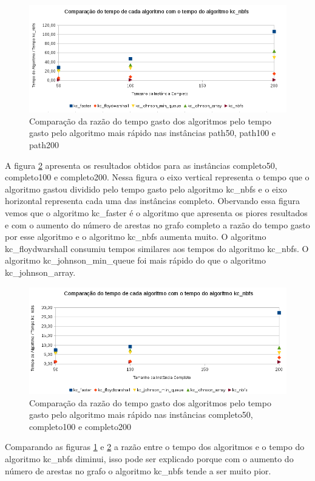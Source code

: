 \begin{figure}
\centering
\includegraphics[width=6in]{path.png}
\caption{Comparação da razão do tempo gasto dos algoritmos pelo tempo gasto pelo algoritmo mais rápido nas instâncias path50, path100 e path200}
\label{path}
\end{figure}

A figura \ref{completo} apresenta os resultados obtidos para as instâncias completo50, completo100 e completo200.  Nessa figura o eixo vertical representa o tempo que o algoritmo gastou dividido pelo tempo gasto pelo algoritmo kc\_nbfs e o eixo horizontal
representa cada uma das instâncias completo. Obervando essa figura vemos que o algoritmo kc\_faster é o algoritmo que apresenta os piores resultados e com o aumento do número de arestas no grafo completo a razão do tempo gasto por esse algoritmo e o algoritmo kc\_nbfs aumenta muito. O algoritmo kc\_floydwarshall consumiu tempos similares aos tempos do algoritmo kc\_nbfs. O algoritmo
kc\_johnson\_min\_queue foi mais rápido do que o algoritmo kc\_johnson\_array.

\begin{figure}
\centering
\includegraphics[width=6in]{completo.png}
\caption{Comparação da razão do tempo gasto dos algoritmos pelo tempo gasto pelo algoritmo mais rápido nas instâncias completo50,
completo100 e completo200}
\label{completo}
\end{figure}

Comparando as figuras \ref{path} e \ref{completo} a razão entre o tempo dos algoritmos e o tempo do algoritmo kc\_nbfs diminui, isso pode ser explicado porque com o aumento do número de arestas no grafo o algoritmo kc\_nbfs tende a ser muito pior.










